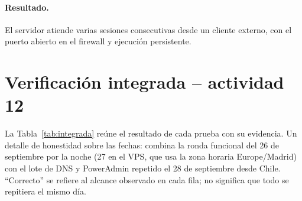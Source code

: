 \documentclass[11pt,a4paper]{article}
\begin{document}
\paragraph{Resultado.} El servidor atiende varias sesiones consecutivas desde un cliente externo, con el puerto abierto en el firewall y ejecución persistente.

\section{Verificación integrada -- actividad 12}
La Tabla~\ref{tab:integrada} reúne el resultado de cada prueba con su evidencia. Un detalle de honestidad sobre las fechas: combina la ronda funcional del 26 de septiembre por la noche (27 en el VPS, que usa la zona horaria Europe/Madrid) con el lote de DNS y PowerAdmin repetido el 28 de septiembre desde Chile. ``Correcto'' se refiere al alcance observado en cada fila; no significa que todo se repitiera el mismo día.
\end{document}
